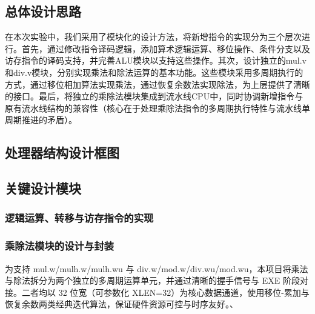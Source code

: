 \documentclass[11pt]{article}
\begin{document}
\subsection{总体设计思路}

在本次实验中，我们采用了模块化的设计方法，将新增指令的实现分为三个层次进行。首先，通过修改指令译码逻辑，添加算术逻辑运算、移位操作、条件分支以及访存指令的译码支持，并完善ALU模块以支持这些操作。其次，设计独立的mul.v和div.v模块，分别实现乘法和除法运算的基本功能。这些模块采用多周期执行的方式，通过移位相加算法实现乘法，通过恢复余数法实现除法，为上层提供了清晰的接口。最后，将独立的乘除法模块集成到流水线CPU中，同时协调新增指令与原有流水线结构的兼容性（核心在于处理乘除法指令的多周期执行特性与流水线单周期推进的矛盾）。

\subsection{处理器结构设计框图}


\subsection{关键设计模块}

\subsubsection{逻辑运算、转移与访存指令的实现}

\subsubsection{乘除法模块的设计与封装}

为支持 mul.w/mulh.w/mulh.wu 与
div.w/mod.w/div.wu/mod.wu，本项目将乘法与除法拆分为两个独立的多周期运算单元，并通过清晰的握手信号与 EXE 阶段对接。二者均以 32 位宽（可参数化 XLEN=32）为核心数据通道，使用移位-累加与恢复余数两类经典迭代算法，保证硬件资源可控与时序友好。、
\end{document}
